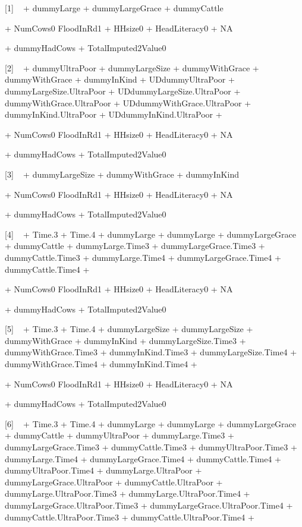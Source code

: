 \begin{Schunk}
\begin{Soutput}


[1]
 ~  + dummyLarge + dummyLargeGrace + dummyCattle

 + NumCows0
FloodInRd1 + HHsize0 + HeadLiteracy0 + NA

 + dummyHadCows
 + TotalImputed2Value0 

[2]
 ~  + dummyUltraPoor + dummyLargeSize + dummyWithGrace
 + dummyWithGrace + dummyInKind + UDdummyUltraPoor
 + dummyLargeSize.UltraPoor + UDdummyLargeSize.UltraPoor + dummyWithGrace.UltraPoor
 + UDdummyWithGrace.UltraPoor + dummyInKind.UltraPoor + UDdummyInKind.UltraPoor
 + 

 + NumCows0
FloodInRd1 + HHsize0 + HeadLiteracy0 + NA

 + dummyHadCows
 + TotalImputed2Value0 

[3]
 ~  + dummyLargeSize + dummyWithGrace + dummyInKind

 + NumCows0
FloodInRd1 + HHsize0 + HeadLiteracy0 + NA

 + dummyHadCows
 + TotalImputed2Value0 

[4]
 ~  + Time.3 + Time.4 + dummyLarge
 + dummyLarge + dummyLargeGrace + dummyCattle
 + dummyLarge.Time3 + dummyLargeGrace.Time3 + dummyCattle.Time3
 + dummyLarge.Time4 + dummyLargeGrace.Time4 + dummyCattle.Time4
 + 

 + NumCows0
FloodInRd1 + HHsize0 + HeadLiteracy0 + NA

 + dummyHadCows
 + TotalImputed2Value0 

[5]
 ~  + Time.3 + Time.4 + dummyLargeSize
 + dummyLargeSize + dummyWithGrace + dummyInKind
 + dummyLargeSize.Time3 + dummyWithGrace.Time3 + dummyInKind.Time3
 + dummyLargeSize.Time4 + dummyWithGrace.Time4 + dummyInKind.Time4
 + 

 + NumCows0
FloodInRd1 + HHsize0 + HeadLiteracy0 + NA

 + dummyHadCows
 + TotalImputed2Value0 

[6]
 ~  + Time.3 + Time.4 + dummyLarge
 + dummyLarge + dummyLargeGrace + dummyCattle
 + dummyUltraPoor + dummyLarge.Time3 + dummyLargeGrace.Time3
 + dummyCattle.Time3 + dummyUltraPoor.Time3 + dummyLarge.Time4
 + dummyLargeGrace.Time4 + dummyCattle.Time4 + dummyUltraPoor.Time4
 + dummyLarge.UltraPoor + dummyLargeGrace.UltraPoor + dummyCattle.UltraPoor
 + dummyLarge.UltraPoor.Time3 + dummyLarge.UltraPoor.Time4 + dummyLargeGrace.UltraPoor.Time3
 + dummyLargeGrace.UltraPoor.Time4 + dummyCattle.UltraPoor.Time3 + dummyCattle.UltraPoor.Time4
 + 


\end{Soutput}
\end{Schunk}
